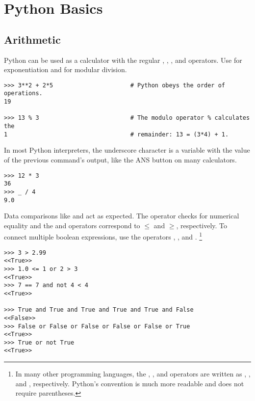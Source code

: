\section*{Python Basics} %

\subsection*{Arithmetic} %

Python can be used as a calculator with the regular \li{+}, \li{-}, \li{*}, and \li{/} operators.
Use \li{**} for exponentiation and \li{\%} for modular division.

\begin{lstlisting}
>>> 3**2 + 2*5                      # Python obeys the order of operations.
19

>>> 13 % 3                          # The modulo operator % calculates the
1                                   # remainder: 13 = (3*4) + 1.
\end{lstlisting}

In most Python interpreters, the underscore character \li{\_} is a variable with the value of the previous command's output, like the ANS button on many calculators.

\begin{lstlisting}
>>> 12 * 3
36
>>> _ / 4
9.0
\end{lstlisting}

Data comparisons like \li{<} and \li{>} act as expected.
The \li{==} operator checks for numerical equality and the \li{<=} and \li{>=} operators correspond to $\le$ and $\ge$, respectively.
To connect multiple boolean expressions, use the operators , , and .%
\footnote{In many other programming languages, the , , and  operators are written as \lif{&&}, \lif{||}, and \lif{!}, respectively. Python's convention is much more readable and does not require parentheses.}

\begin{lstlisting}
>>> 3 > 2.99
<<True>>
>>> 1.0 <= 1 or 2 > 3
<<True>>
>>> 7 == 7 and not 4 < 4
<<True>>

>>> True and True and True and True and True and False
<<False>>
>>> False or False or False or False or False or True
<<True>>
>>> True or not True
<<True>>
\end{lstlisting}

